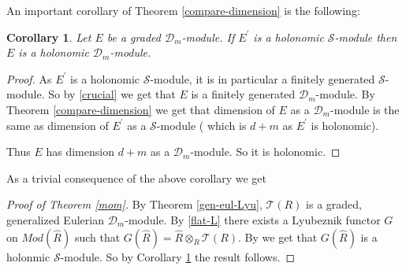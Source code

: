 \documentclass{amsart}
\newcommand{\D}{\mathcal{D} }
\newcommand{\Sc}{\mathcal{S} }
\newcommand{\FF}{\mathcal{T}}
\theoremstyle{plain}
\newtheorem{corollary}[theorem]{Corollary}
\theoremstyle{definition}
\theoremstyle{remark}
\begin{document}
An important corollary of Theorem \ref{compare-dimension} is the following:
\begin{corollary}\label{rach2}
Let $E$ be a graded $\D_m$-module. If $E^\prime$ is a holonomic $\Sc$-module then $E$ is a holonomic $\D_m$-module.
\end{corollary}
\begin{proof}
As $E^\prime$ is a holonomic $\Sc$-module, it is in particular a finitely generated $\Sc$-module. So by \ref{crucial} we get that $E$ is a finitely generated $\D_m$-module. By
Theorem \ref{compare-dimension} we get that  dimension of $E$ as a $\D_m$-module is the same as dimension of $E^\prime$ as a $\Sc$-module ( which is $d + m$ as $E^\prime$ is holonomic).

Thus $E$ has dimension $d + m$ as a $\D_m$-module. So it is holonomic.
\end{proof}
As a trivial consequence of the above corollary we get
\begin{proof}[Proof of Theorem  \ref{mom}]
By Theorem \ref{gen-eul-Lyu}, $\FF(R)$ is a graded, generalized Eulerian $\D_m$-module.
By \ref{flat-L} there exists a Lyubeznik functor $G$ on $Mod(\widehat{R})$ such that $G(\widehat{R}) = \widehat{R}\otimes_R \FF(R)$. By \cite[2.2d]{Lyu-1} we get that $G(\widehat{R})$
is a holonmic $\Sc$-module. So by Corollary \ref{rach2} the result follows.
\end{proof}
\end{document}
